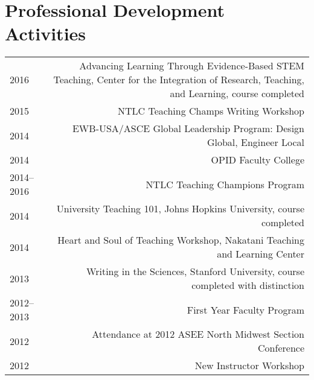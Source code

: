 \section*{Professional Development Activities}
\begin{tabular}{L!{\VRule}R}
2016&Advancing Learning Through Evidence-Based STEM Teaching, Center for the Integration of Research, Teaching, and Learning, course completed\\
2015&NTLC Teaching Champs Writing Workshop\\
2014&EWB-USA/ASCE Global Leadership Program: Design Global, Engineer Local\\
2014&OPID Faculty College\\
2014--2016&NTLC Teaching Champions Program\\
2014&University Teaching 101, Johns Hopkins University, course completed\\
2014&Heart and Soul of Teaching Workshop, Nakatani Teaching and Learning Center\\
2013&Writing in the Sciences, Stanford University, course completed with distinction\\
2012--2013&First Year Faculty Program\\
2012&Attendance at 2012 ASEE North Midwest Section Conference\\
2012&New Instructor Workshop\\
\end{tabular}